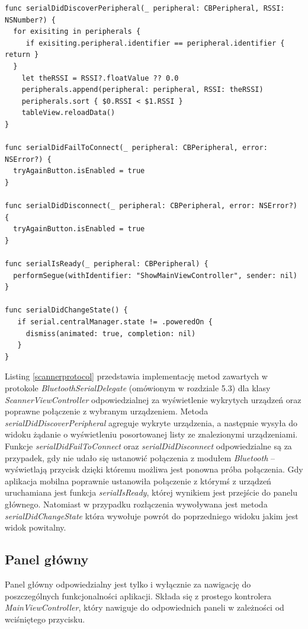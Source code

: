 \begin{minipage}{\textwidth}
	\begin{lstlisting}[label=scannerprotocol,caption=Implementacja protokołu.]
func serialDidDiscoverPeripheral(_ peripheral: CBPeripheral, RSSI: NSNumber?) {
  for exisiting in peripherals {
     if exisiting.peripheral.identifier == peripheral.identifier { return }
  }
    let theRSSI = RSSI?.floatValue ?? 0.0
    peripherals.append(peripheral: peripheral, RSSI: theRSSI)
    peripherals.sort { $0.RSSI < $1.RSSI }
    tableView.reloadData()
}
  
func serialDidFailToConnect(_ peripheral: CBPeripheral, error: NSError?) {
  tryAgainButton.isEnabled = true
}
  
func serialDidDisconnect(_ peripheral: CBPeripheral, error: NSError?) {
  tryAgainButton.isEnabled = true
}
  
func serialIsReady(_ peripheral: CBPeripheral) {
  performSegue(withIdentifier: "ShowMainViewController", sender: nil)
}
  
func serialDidChangeState() {
   if serial.centralManager.state != .poweredOn {
     dismiss(animated: true, completion: nil)
   }
}
	\end{lstlisting}
\end{minipage}

Listing \ref{scannerprotocol} przedstawia implementację metod zawartych w protokole \textit{BluetoothSerialDelegate} (omówionym w rozdziale 5.3) dla klasy \textit{ScannerViewController} odpowiedzialnej za wyświetlenie wykrytych urządzeń oraz poprawne połączenie z wybranym urządzeniem. Metoda \textit{serialDidDiscoverPeripheral} agreguje wykryte urządzenia, a następnie wysyła do widoku żądanie o wyświetleniu posortowanej listy ze znalezionymi urządzeniami. Funkcje \textit{serialDidFailToConnect} oraz \textit{serialDidDisconnect} odpowiedzialne są za przypadek, gdy nie udało się ustanowić połączenia z modułem \textit{Bluetooth} – wyświetlają przycisk dzięki któremu możliwa jest ponowna próba połączenia. Gdy aplikacja mobilna poprawnie ustanowiła połączenie z którymś z urządzeń uruchamiana jest funkcja \textit{serialIsReady}, której wynikiem jest przejście do panelu głównego.  Natomiast w przypadku rozłączenia wywoływana jest metoda \textit{serialDidChangeState} która wywołuje powrót do poprzedniego widoku jakim jest widok powitalny.

\subsection{Panel główny}
Panel główny odpowiedzialny jest tylko i wyłącznie za nawigację do poszczególnych funkcjonalności aplikacji. Składa się z prostego kontrolera \textit{MainViewController}, który nawiguje do odpowiednich paneli w zależności od wciśniętego przycisku.

